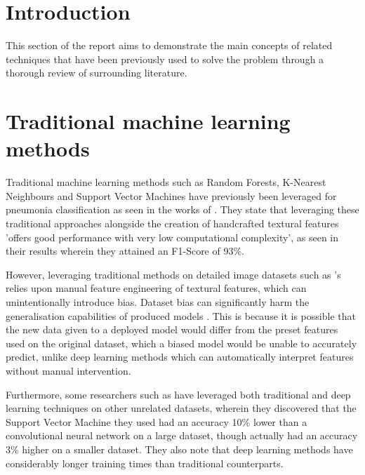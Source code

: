 \documentclass[12pt]{report}
\newcommand{\para}{\vspace{7pt}\noindent}
\begin{document}

\section{Introduction}
This section of the report aims to demonstrate the main concepts
of related techniques that have been previously used to solve the problem 
through a thorough review of surrounding literature.


\section{Traditional machine learning methods}
Traditional machine learning methods such as Random Forests, K-Nearest Neighbours and Support 
Vector Machines have previously been leveraged for pneumonia classification as seen in the works of 
\textcite{ortiz-toroAutomaticDetectionPneumonia2022}. They state that leveraging these traditional approaches
alongside the creation of handcrafted textural features 'offers good performance with very low computational complexity',
as seen in their results wherein they attained an F1-Score
of 93\%.

\para However, leveraging traditional methods on detailed image datasets such as \textcite{kermanyIdentifyingMedicalDiagnoses2018}'s
relies upon manual feature engineering of textural features, which can unintentionally introduce bias. Dataset bias can significantly harm the generalisation capabilities of produced models \autocite{selvarajuGradCAMVisualExplanations2017}.
This is because it is possible that the new data given to a deployed model would differ from the preset features used on the original dataset,
which a biased model would be unable to accurately predict, unlike deep learning methods which can automatically interpret features without 
manual intervention.

\para Furthermore, some researchers such as \textcite{wangComparativeAnalysisImage2021} have leveraged both traditional and deep learning 
techniques on other unrelated datasets, wherein they discovered that the Support Vector Machine they used had an accuracy 10\% lower than 
a convolutional neural network on a large dataset, though actually had an accuracy 3\% higher on a smaller dataset. They also note that
deep learning methods have considerably longer training times than traditional counterparts.
\end{document}
